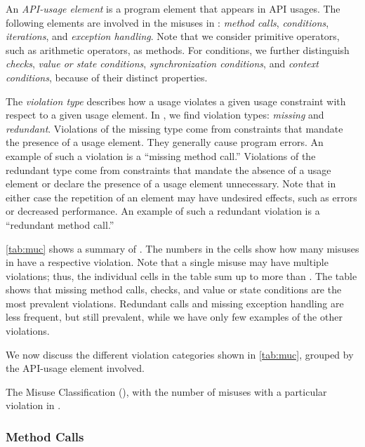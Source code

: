 An \textit{API-usage element} is a program element that appears in API usages.
The following elements are involved in the misuses in \MUBench:
\emph{method calls}, \emph{conditions}, \emph{iterations}, and \emph{exception handling}.
Note that we consider primitive operators, such as arithmetic operators, as methods.
For conditions, we further distinguish \emph{ checks}, \emph{value or state conditions}, \emph{synchronization conditions}, and \emph{context conditions}, because of their distinct properties.

The \textit{violation type} describes how a usage violates a given usage constraint with respect to a given usage element.
In \MUBench, we find  violation types: {\em missing} and {\em redundant}.
Violations of the missing type come from constraints that mandate the presence of a usage element.
They generally cause program errors.
An example of such a violation is a ``missing method call.''
Violations of the redundant type come from constraints that mandate the absence of a usage element or declare the presence of a usage element unnecessary.
Note that in either case the repetition of an element may have undesired effects, such as errors or decreased performance.
An example of such a redundant violation is a ``redundant method call.''

\autoref{tab:muc} shows a summary of \MUC.
The numbers in the cells show how many misuses in \MUBench have a respective violation.
Note that a single misuse may have multiple violations; thus, the individual cells in the table sum up to more than .
The table shows that missing method calls,  checks, and value or state conditions are the most prevalent violations.
Redundant calls and missing exception handling are less frequent, but still prevalent, while we have only few examples of the other violations.

We now discuss the different violation categories shown in \autoref{tab:muc}, grouped by the API-usage element involved.

\begin{table}
  \centering
  \caption{The Misuse Classification (\MUC), with the number of misuses with a particular violation in \MUBench.}
    
  \label{tab:muc}
\end{table}


\subsubsection*{Method Calls}

